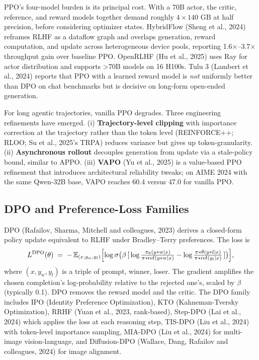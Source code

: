PPO's four-model burden is its principal cost. With a 70B actor, the critic, reference, and reward models together demand roughly \(4 \times 140\) GB at half precision, before considering optimizer states. HybridFlow (Sheng et al., 2024) reframes RLHF as a dataflow graph and overlaps generation, reward computation, and update across heterogeneous device pools, reporting 1.6×--3.7× throughput gain over baseline PPO. OpenRLHF (Hu et al., 2025) uses Ray for actor distribution and supports \textgreater70B models on 16 H100s. Tulu 3 (Lambert et al., 2024) reports that PPO with a learned reward model is \emph{not} uniformly better than DPO on chat benchmarks but is decisive on long-form open-ended generation.

For long agentic trajectories, vanilla PPO degrades. Three engineering refinements have emerged. (i) \textbf{Trajectory-level clipping} with importance correction at the trajectory rather than the token level (REINFORCE++; RLOO; Su et al., 2025's TRPA) reduces variance but gives up token-granularity. (ii) \textbf{Asynchronous rollout} decouples generation from update via a stale-policy bound, similar to APPO. (iii) \textbf{VAPO} (Yu et al., 2025) is a value-based PPO refinement that introduces architectural reliability tweaks; on AIME 2024 with the same Qwen-32B base, VAPO reaches 60.4 versus 47.0 for vanilla PPO.

\subsection{DPO and Preference-Loss Families}\label{dpo-and-preference-loss-families}

DPO (Rafailov, Sharma, Mitchell and colleagues, 2023) derives a closed-form policy update equivalent to RLHF under Bradley--Terry preferences. The loss is
\[L^{\mathrm{DPO}}(\theta) \;=\; -\,\mathbb{E}_{(x, y_w, y_l)} \Bigl[\log \sigma\bigl(\beta\,[\, \log \tfrac{\pi_\theta(y*w\mid x)}{\pi*{\mathrm{ref}}(y*w\mid x)} - \log \tfrac{\pi*\theta(y*l\mid x)}{\pi*{\mathrm{ref}}(y_l\mid x)} \,]\bigr) \Bigr],\]
where \((x, y_w, y_l)\) is a triple of prompt, winner, loser. The gradient amplifies the chosen completion's log-probability relative to the rejected one's, scaled by \(\beta\) (typically 0.1). DPO removes the reward model and the critic. The DPO family includes IPO (Identity Preference Optimization), KTO (Kahneman-Tversky Optimization), RRHF (Yuan et al., 2023, rank-based), Step-DPO (Lai et al., 2024) which applies the loss at each reasoning step, TIS-DPO (Liu et al., 2024) with token-level importance sampling, MIA-DPO (Liu et al., 2024) for multi-image vision-language, and Diffusion-DPO (Wallace, Dang, Rafailov and colleagues, 2024) for image alignment.

